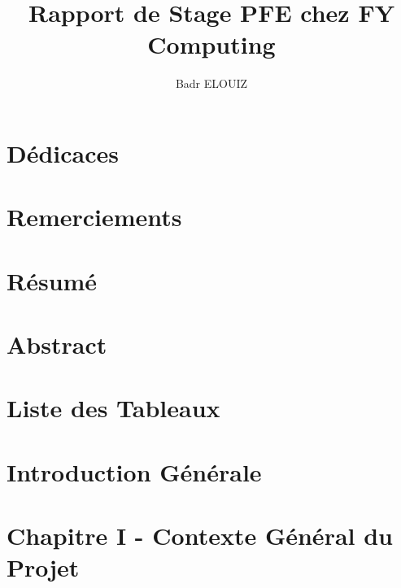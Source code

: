 \documentclass[a4paper,11pt,oneside]{report}
\author{Badr ELOUIZ}
\title{Rapport de Stage PFE chez FY Computing}
\begin{document}
\sloppy

\makeatletter



\makeatother

\newpage

\newpage

\chapter*{Dédicaces}

\newpage

\chapter*{Remerciements}

\newpage

\chapter*{Résumé}

\newpage

\chapter*{Abstract}

\newpage

\tableofcontents

\newpage

\listoffigures

\newpage

\chapter*{Liste des Tableaux}

\newpage

\chapter{Introduction Générale}



\newpage

\chapter{Chapitre I - Contexte Général du Projet}

\newpage


\end{document}
